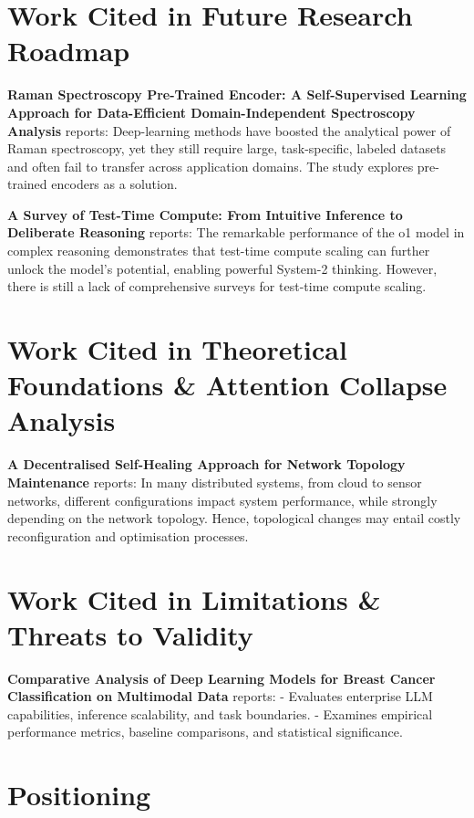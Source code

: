 \documentclass{article}
\begin{document}
\section{Work Cited in Future Research Roadmap}


\textbf{Raman Spectroscopy Pre-Trained Encoder: A Self-Supervised Learning Approach for Data-Efficient Domain-Independent Spectroscopy Analysis} \cite{doaj_001772c2113c476d9d5d40452c8e10e1} reports: Deep-learning methods have boosted the analytical power of Raman spectroscopy, yet they still require large, task-specific, labeled datasets and often fail to transfer across application domains. The study explores pre-trained encoders as a solution.

\textbf{A Survey of Test-Time Compute: From Intuitive Inference to Deliberate Reasoning} \cite{arxiv_2501_02497} reports: The remarkable performance of the o1 model in complex reasoning demonstrates that test-time compute scaling can further unlock the model's potential, enabling powerful System-2 thinking. However, there is still a lack of comprehensive surveys for test-time compute scaling.


\section{Work Cited in Theoretical Foundations \& Attention Collapse Analysis}


\textbf{A Decentralised Self-Healing Approach for Network Topology Maintenance} \cite{arxiv_2010_11146} reports: In many distributed systems, from cloud to sensor networks, different configurations impact system performance, while strongly depending on the network topology. Hence, topological changes may entail costly reconfiguration and optimisation processes.


\section{Work Cited in Limitations \& Threats to Validity}


\textbf{Comparative Analysis of Deep Learning Models for Breast Cancer Classification on Multimodal Data} \cite{crossref_10_1145_3689096_3689462} reports: - Evaluates enterprise LLM capabilities, inference scalability, and task boundaries. - Examines empirical performance metrics, baseline comparisons, and statistical significance.


\section{Positioning}
\end{document}

